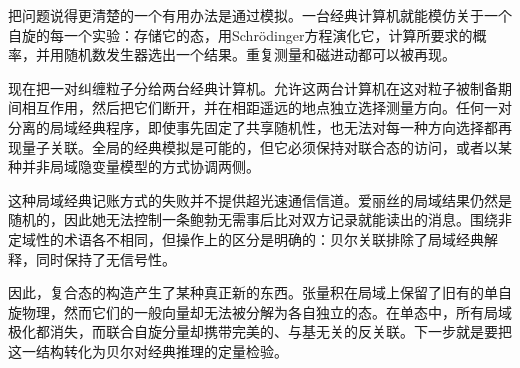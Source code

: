 把问题说得更清楚的一个有用办法是通过模拟。一台经典计算机就能模仿关于一个自旋的每一个实验：存储它的态，用Schr\"odinger方程演化它，计算所要求的概率，并用随机数发生器选出一个结果。重复测量和磁进动都可以被再现。

现在把一对纠缠粒子分给两台经典计算机。允许这两台计算机在这对粒子被制备期间相互作用，然后把它们断开，并在相距遥远的地点独立选择测量方向。任何一对分离的局域经典程序，即使事先固定了共享随机性，也无法对每一种方向选择都再现量子关联。全局的经典模拟是可能的，但它必须保持对联合态的访问，或者以某种并非局域隐变量模型的方式协调两侧。

这种局域经典记账方式的失败并不提供超光速通信信道。爱丽丝的局域结果仍然是随机的，因此她无法控制一条鲍勃无需事后比对双方记录就能读出的消息。围绕非定域性的术语各不相同，但操作上的区分是明确的：贝尔关联排除了局域经典解释，同时保持了无信号性。

因此，复合态的构造产生了某种真正新的东西。张量积在局域上保留了旧有的单自旋物理，然而它们的一般向量却无法被分解为各自独立的态。在单态中，所有局域极化都消失，而联合自旋分量却携带完美的、与基无关的反关联。下一步就是要把这一结构转化为贝尔对经典推理的定量检验。
